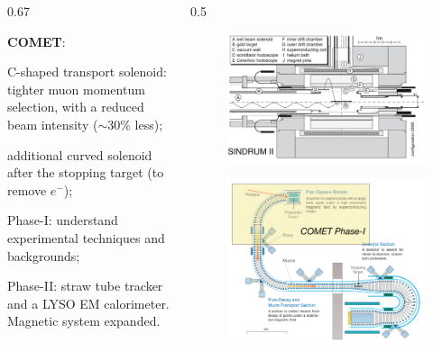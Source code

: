 \documentclass{beamer}
\begin{document}
\begin{frame}
\begin{columns}
\begin{column}{0.67\framewidth}
\begin{itemize}
{   \item \textbf{COMET}: }
  \begin{itemize}
    {\small  
    \item  C-shaped transport solenoid: tighter
    muon momentum selection, with a reduced beam intensity ($\sim$30\% less);
    \item additional curved solenoid after 
    the stopping target (to remove $e^-$);
    \item Phase-I: understand experimental 
    techniques and backgrounds;
    \item Phase-II: straw tube 
    tracker and a LYSO EM  
    calorimeter. Magnetic system expanded.
    }
  \end{itemize}
    \end{itemize}
    \end{column}
    \begin{column}{0.5\framewidth}
        \begin{figure}[!h]
            \centering
            \includegraphics[width =0.9\columnwidth]{figures/png/Screenshot_20240307_163120.png}
            \label{fig:sindrumii}
            \end{figure}
            \begin{figure}[!h]
                \centering
                \includegraphics[width =0.9\columnwidth]{figures/png/Screenshot_20240307_152133.png}

\end{figure}
\end{column}
\end{columns}
\end{frame}
\end{document}
